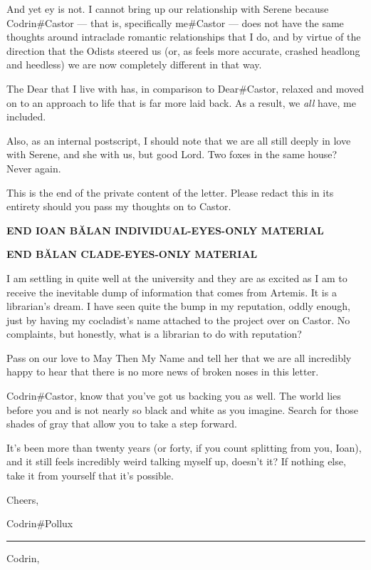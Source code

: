 And yet ey is not. I cannot bring up our relationship with Serene because Codrin\#Castor — that is, specifically me\#Castor — does not have the same thoughts around intraclade romantic relationships that I do, and by virtue of the direction that the Odists steered us (or, as feels more accurate, crashed headlong and heedless) we are now completely different in that way.

The Dear that I live with has, in comparison to Dear\#Castor, relaxed and moved on to an approach to life that is far more laid back. As a result, we \emph{all} have, me included.

Also, as an internal postscript, I should note that we are all still deeply in love with Serene, and she with us, but good Lord. Two foxes in the same house? Never again.

This is the end of the private content of the letter. Please redact this in its entirety should you pass my thoughts on to Castor.

\textbf{END IOAN BĂLAN INDIVIDUAL-EYES-ONLY MATERIAL}

\textbf{END BĂLAN CLADE-EYES-ONLY MATERIAL}

I am settling in quite well at the university and they are as excited as I am to receive the inevitable dump of information that comes from Artemis. It is a librarian's dream. I have seen quite the bump in my reputation, oddly enough, just by having my cocladist's name attached to the project over on Castor. No complaints, but honestly, what is a librarian to do with reputation?

Pass on our love to May Then My Name and tell her that we are all incredibly happy to hear that there is no more news of broken noses in this letter.

Codrin\#Castor, know that you've got us backing you as well. The world lies before you and is not nearly so black and white as you imagine. Search for those shades of gray that allow you to take a step forward.

It's been more than twenty years (or forty, if you count splitting from you, Ioan), and it still feels incredibly weird talking myself up, doesn't it? If nothing else, take it from yourself that it's possible.

Cheers,

Codrin\#Pollux

\begin{center}\rule{0.5\linewidth}{0.5pt}\end{center}

Codrin,

